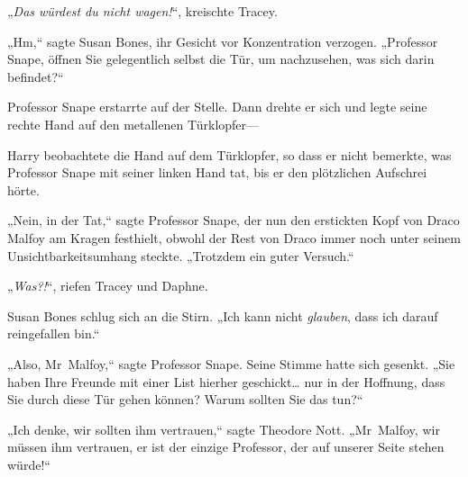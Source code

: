 „\emph{Das würdest du nicht wagen!}“, kreischte Tracey.

„Hm,“ sagte Susan Bones, ihr Gesicht vor Konzentration verzogen. „Professor Snape, öffnen Sie gelegentlich selbst die Tür, um nachzusehen, was sich darin befindet?“

Professor Snape erstarrte auf der Stelle. Dann drehte er sich und legte seine rechte Hand auf den metallenen Türklopfer—

Harry beobachtete die Hand auf dem Türklopfer, so dass er nicht bemerkte, was Professor Snape mit seiner linken Hand tat, bis er den plötzlichen Aufschrei hörte.

„Nein, in der Tat,“ sagte Professor Snape, der nun den erstickten Kopf von Draco Malfoy am Kragen festhielt, obwohl der Rest von Draco immer noch unter seinem Unsichtbarkeitsumhang steckte. „Trotzdem ein guter Versuch.“

„\emph{Was?!}“, riefen Tracey und Daphne.

Susan Bones schlug sich an die Stirn. „Ich kann nicht \emph{glauben}, dass ich darauf reingefallen bin.“

„Also, Mr~Malfoy,“ sagte Professor Snape. Seine Stimme hatte sich gesenkt.
„Sie haben Ihre Freunde mit einer List hierher geschickt… nur in der Hoffnung, dass Sie durch diese Tür gehen können? Warum sollten Sie das tun?“

„Ich denke, wir sollten ihm vertrauen,“ sagte Theodore Nott. „Mr~Malfoy, wir müssen ihm vertrauen, er ist der einzige Professor, der auf unserer Seite stehen würde!“

